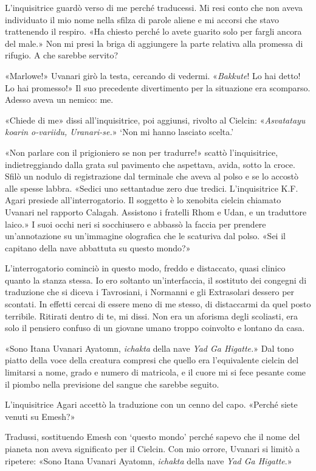 L'inquisitrice guardò verso di me perché traducessi. Mi resi conto che
non aveva individuato il mio nome nella sfilza di parole aliene e mi
accorsi che stavo trattenendo il respiro. «Ha chiesto perché lo avete
guarito solo per fargli ancora del male.» Non mi presi la briga di
aggiungere la parte relativa alla promessa di rifugio. A che sarebbe
servito?

«Marlowe!» Uvanari girò la testa, cercando di vedermi. «\emph{Bakkute}!
Lo hai detto! Lo hai promesso!» Il suo precedente divertimento per la
situazione era scomparso. Adesso aveva un nemico: me.

«Chiede di me» dissi all'inquisitrice, poi aggiunsi, rivolto al Cielcin:
«\emph{Asvatatayu koarin o-variidu, Uranari-se.}» `Non mi hanno lasciato
scelta.'

«Non parlare con il prigioniero se non per tradurre!» scattò
l'inquisitrice, indietreggiando dalla grata sul pavimento che aspettava,
avida, sotto la croce. Sfilò un nodulo di registrazione dal terminale
che aveva al polso e se lo accostò alle spesse labbra. «Sedici uno
settantadue zero due tredici. L'inquisitrice K.F. Agari presiede
all'interrogatorio. Il soggetto è lo xenobita cielcin chiamato Uvanari
nel rapporto Calagah. Assistono i fratelli Rhom e Udan, e un traduttore
laico.» I suoi occhi neri si socchiusero e abbassò la faccia per
prendere un'annotazione su un'immagine olografica che le scaturiva dal
polso. «Sei il capitano della nave abbattuta su questo mondo?»

L'interrogatorio cominciò in questo modo, freddo e distaccato, quasi
clinico quanto la stanza stessa. Io ero soltanto un'interfaccia, il
sostituto dei congegni di traduzione che si diceva i Tavrosiani, i
Normanni e gli Extrasolari dessero per scontati. In effetti cercai di
essere meno di me stesso, di distaccarmi da quel posto terribile.
Ritirati dentro di te, mi dissi. Non era un aforisma degli scoliasti,
era solo il pensiero confuso di un giovane umano troppo coinvolto e
lontano da casa.

«Sono Itana Uvanari Ayatomn, \emph{ichakta} della nave \emph{Yad Ga
	Higatte.}» Dal tono piatto della voce della creatura compresi che quello
era l'equivalente cielcin del limitarsi a nome, grado e numero di
matricola, e il cuore mi si fece pesante come il piombo nella previsione
del sangue che sarebbe seguito.

L'inquisitrice Agari accettò la traduzione con un cenno del capo.
«Perché siete venuti su Emesh?»

Tradussi, sostituendo Emesh con `questo mondo' perché sapevo che il nome
del pianeta non aveva significato per il Cielcin. Con mio orrore,
Uvanari si limitò a ripetere: «Sono Itana Uvanari Ayatomn,
\emph{ichakta} della nave \emph{Yad Ga Higatte}.»

